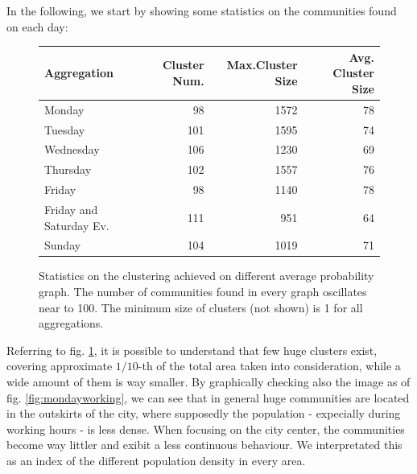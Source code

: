 \documentclass[12pt,a4paper]{article}
\begin{document}
In the following, we start by showing some statistics on the communities found on each day:

\begin{figure}[H]
\centering
\begin{tabular}{| l | r | r | r |}
\hline
\textbf{Aggregation} & \textbf{Cluster Num.} & \textbf{Max.Cluster Size} & \textbf{Avg. Cluster Size} \\ \hline
Monday & 98 & 1572 & 78 \\ \hline
Tuesday & 101 & 1595 & 74 \\ \hline
Wednesday & 106 & 1230  & 69 \\ \hline
Thursday & 102 & 1557  & 76 \\ \hline
Friday &  98 & 1140 & 78 \\ \hline
Friday and Saturday Ev. & 111 & 951 & 64 \\ \hline
Sunday & 104 & 1019 & 71 \\ \hline
\end{tabular}
\caption{Statistics on the clustering achieved on different average probability graph. The number of communities found
in every graph oscillates near to 100. The minimum size of clusters (not shown) is 1 for all aggregations.}
\label{fig:foundClusters}
\end{figure}

Referring to fig. \ref{fig:foundClusters}, it is possible to understand that few huge clusters exist, covering approximate $1/10$-th of the total area taken into consideration, while a wide amount of them is way smaller.
By graphically checking also the image as of fig. \ref{fig:mondayworking}, we can see that in general huge communities are located in the outskirts of the city, where supposedly the population - expecially during working hours - is less dense. When focusing on the city center, the communities become way littler and exibit a less continuous behaviour. We interpretated this as an index of the different population density in every area.
\end{document}

